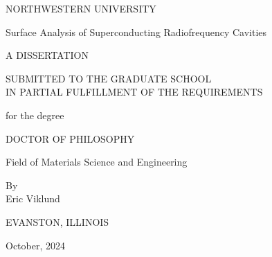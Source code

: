 \documentclass[12pt]{report}
\begin{document}
    \begin{titlepage}
        \begin{center}

            NORTHWESTERN UNIVERSITY\\

            \vfill
    
            Surface Analysis of Superconducting Radiofrequency Cavities\\

            \vfill

            A DISSERTATION\\

            \vfill

            SUBMITTED TO THE GRADUATE SCHOOL\\
            IN PARTIAL FULFILLMENT OF THE REQUIREMENTS\\

            \vfill

            for the degree\\

            \vfill

            DOCTOR OF PHILOSOPHY\\
            
            \vfill

            Field of Materials Science and Engineering\\

            \vfill

            By\\
            \vspace*{0.5cm}
            Eric Viklund\\

            \vfill

            EVANSTON, ILLINOIS\\

            \vfill

            October, 2024\\
                
        \end{center}
    \end{titlepage}





    \begin{abstract}
        
    \end{abstract}

    




    \renewcommand{\abstractname}{Acknowledgements}
    \begin{abstract}

    \end{abstract}
\end{document}

